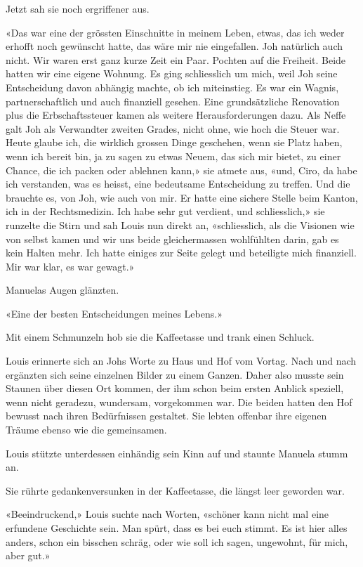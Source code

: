 Jetzt sah sie noch ergriffener aus.

«Das war eine der grössten Einschnitte in meinem Leben, etwas, das ich
weder erhofft noch gewünscht hatte, das wäre mir nie eingefallen. Joh
natürlich auch nicht. Wir waren erst ganz kurze Zeit ein Paar. Pochten
auf die Freiheit. Beide hatten wir eine eigene Wohnung. Es ging
schliesslich um mich, weil Joh seine Entscheidung davon abhängig machte,
ob ich miteinstieg. Es war ein Wagnis, partnerschaftlich und auch
finanziell gesehen. Eine grundsätzliche Renovation plus die
Erbschaftssteuer kamen als weitere Herausforderungen dazu. Als Neffe
galt Joh als Verwandter zweiten Grades, nicht ohne, wie hoch die Steuer
war. Heute glaube ich, die wirklich grossen Dinge geschehen, wenn sie
Platz haben, wenn ich bereit bin, ja zu sagen zu etwas Neuem, das sich
mir bietet, zu einer Chance, die ich packen oder ablehnen kann,» sie
atmete aus, «und, Ciro, da habe ich verstanden, was es heisst, eine
bedeutsame Entscheidung zu treffen. Und die brauchte es, von Joh, wie
auch von mir. Er hatte eine sichere Stelle beim Kanton, ich in der
Rechtsmedizin. Ich habe sehr gut verdient, und schliesslich,» sie
runzelte die Stirn und sah Louis nun direkt an, «schliesslich, als die
Visionen wie von selbst kamen und wir uns beide gleichermassen
wohlfühlten darin, gab es kein Halten mehr. Ich hatte einiges zur Seite
gelegt und beteiligte mich finanziell. Mir war klar, es war gewagt.»

Manuelas Augen glänzten.

«Eine der besten Entscheidungen meines Lebens.»

Mit einem Schmunzeln hob sie die Kaffeetasse und trank einen Schluck.

Louis erinnerte sich an Johs Worte zu Haus und Hof vom Vortag. Nach und
nach ergänzten sich seine einzelnen Bilder zu einem Ganzen. Daher also
musste sein Staunen über diesen Ort kommen, der ihm schon beim ersten
Anblick speziell, wenn nicht geradezu, wundersam, vorgekommen war. Die
beiden hatten den Hof bewusst nach ihren Bedürfnissen gestaltet. Sie
lebten offenbar ihre eigenen Träume ebenso wie die gemeinsamen.

Louis stützte unterdessen einhändig sein Kinn auf und staunte Manuela
stumm an.

Sie rührte gedankenversunken in der Kaffeetasse, die längst leer
geworden war.

«Beeindruckend,» Louis suchte nach Worten, «schöner kann nicht mal eine
erfundene Geschichte sein. Man spürt, dass es bei euch stimmt. Es ist
hier alles anders, schon ein bisschen schräg, oder wie soll ich sagen,
ungewohnt, für mich, aber gut.»

